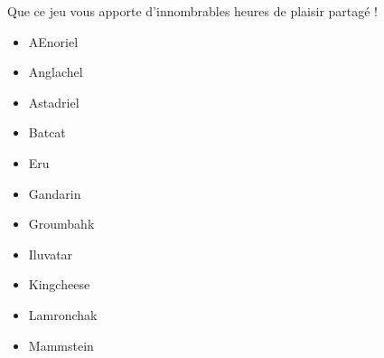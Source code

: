 \begin{titlepage}
{\vspace{0.5cm}
Que ce jeu vous apporte d'innombrables heures de plaisir partagé !

\vspace{0.7cm}
\vspace{0.5cm}

\begin{multicols}{3}
\begin{itemize}
\item \og AEnoriel \fg{}
\item \og Anglachel \fg{}
\item \og Astadriel \fg{}
\item \og Batcat \fg{}
\item \og Eru \fg{}
\item \og Gandarin \fg{}
\item \og Groumbahk \fg{}
\item \og Iluvatar \fg{}
\item \og Kingcheese \fg{}
\item \og Lamronchak \fg{}
\item \og Mammstein \fg{}
\end{itemize}
\end{multicols}

\vfill

}


\end{titlepage}